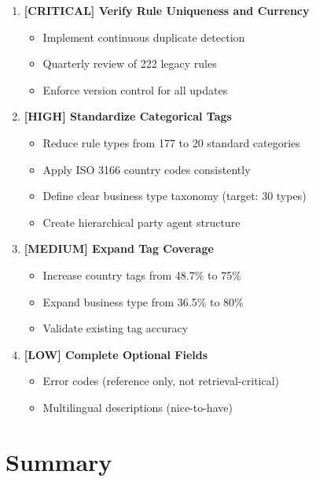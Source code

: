 \begin{enumerate}[leftmargin=*,itemsep=4pt,topsep=4pt]
 \item \textbf{[CRITICAL] Verify Rule Uniqueness and Currency}
   \begin{itemize}[leftmargin=*,itemsep=1pt,topsep=1pt]
     \item Implement continuous duplicate detection
     \item Quarterly review of 222 legacy rules
     \item Enforce version control for all updates
   \end{itemize}
   
 \item \textbf{[HIGH] Standardize Categorical Tags}
   \begin{itemize}[leftmargin=*,itemsep=1pt,topsep=1pt]
     \item Reduce rule types from 177 to 20 standard categories
     \item Apply ISO 3166 country codes consistently
     \item Define clear business type taxonomy (target: 30 types)
     \item Create hierarchical party agent structure
   \end{itemize}
   
 \item \textbf{[MEDIUM] Expand Tag Coverage}
   \begin{itemize}[leftmargin=*,itemsep=1pt,topsep=1pt]
     \item Increase country tags from 48.7\% to 75\%
     \item Expand business type from 36.5\% to 80\%
     \item Validate existing tag accuracy
   \end{itemize}
   
 \item \textbf{[LOW] Complete Optional Fields}
   \begin{itemize}[leftmargin=*,itemsep=1pt,topsep=1pt]
     \item Error codes (reference only, not retrieval-critical)
     \item Multilingual descriptions (nice-to-have)
   \end{itemize}
\end{enumerate}

\section{Summary}

